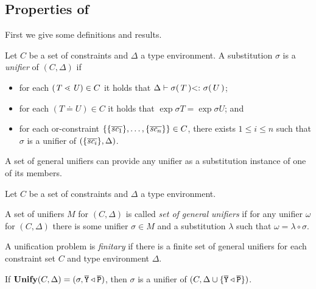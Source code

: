 \subsection{Properties of \unify{}}
\label{sec:properties-unify}

First we give some definitions and results.

\begin{definition}[Unifier]
  Let $C$ be a set of constraints and $\Delta$ a type environment.
  A substitution $\sigma$  is a \emph{unifier} of $(C,\Delta)$ if
  \begin{itemize}
  \item for each $(\mathit{T} \lessdot \mathit{U}) \in C$ it holds that
    $\Delta \vdash \sigma(\,T\,) \textrm{$<:$}\  \sigma(\,U\,)$;
  \item  for each $(T \doteq U) \in C$ it holds that
    $\exp{\sigma}{T} = \exp{\sigma}{U}$; and
  \item for each or-constraint $\{ \{ \overline{\textit{sc}_1} \},
      \ldots, \{ \overline{\textit{sc}_n} \} \} \in C$, there exists $1
    \le i \le n$ such that $\sigma$ is a unifier of
    $(\{ \overline{\textit{sc}_i} \}, \Delta)$. 
  \end{itemize}
\end{definition}

A set of general unifiers can provide any unifier as a substitution
instance of one of its members.
\begin{definition}
  Let $C$ be a set of constraints and $\Delta$ a type environment. 

  A set of unifiers $M$ for $(C, \Delta)$
  is called \emph{set of general unifiers} if for any unifier $\omega$
  for $(C, \Delta)$ there is some unifier $\sigma \in M$ and a substitution
  $\lambda$ such that $\omega = \lambda   \circ \sigma$.
\end{definition}

A unification problem is \emph{finitary} if there is a finite set of
general unifiers for each constraint set $C$ and type environment $\Delta$.

\begin{theorem}[Soundness]
  \label{theo:unifySoundness}
   If $\textbf{Unify}{}(C, \Delta) = {(\sigma,  \overline{\tt Y} \triangleleft
     \overline{\tt P})}$, then $\sigma$ is a unifier of $(C,\Delta \cup \{ \overline{\tt Y} \triangleleft
     \overline{\tt P} \})$. 
\end{theorem}

